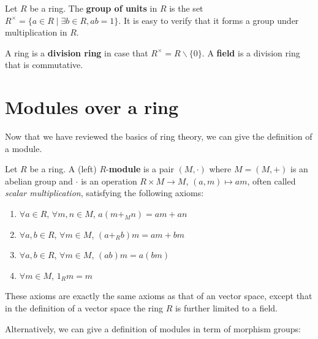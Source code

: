 \documentclass[12pt, a4paper, titlepage]{report}
\begin{document}
\begin{defn}
  Let $R$ be a ring. The \textbf{group of units} in $R$ is the set
  $R^{\times} = \{ a \in R \mid \exists b \in R, ab = 1 \}$. It is easy to
  verify that it forms a group under multiplication in $R$.
\end{defn}

\begin{defn}
  A ring is a \textbf{division ring} in case that $R^{\times} = R \backslash \{0\}$.
  A \textbf{field} is a division ring that is commutative.
\end{defn}

\section{Modules over a ring}
Now that we have reviewed the basics of ring theory, we can give the definition of a module.

\begin{defn}[module]
  Let $R$ be a ring. A (left) $R$-\textbf{module} is a pair $(M, \cdot)$ where $M = (M, +)$ is an abelian group
  and $\cdot$ is an operation $R \times M \rightarrow M$, $(a, m) \mapsto am$, often called \textit{scalar multiplication},
  satisfying the following axioms:
  \begin{enumerate}
  \item $\forall a \in R$, $\forall m, n \in M$, $a(m +_{M} n) = am + an$
  \item $\forall a, b \in R$, $\forall m \in M$, $(a +_{R} b)m = am + bm$
  \item $\forall a, b \in R$, $\forall m \in M$, $(ab)m = a(bm)$
  \item $\forall m \in M$, $1_{R}m = m$
  \end{enumerate}
\end{defn}

\begin{rem}
  These axioms are exactly the same axioms as that of an vector space, except that in the definition of a vector space
  the ring $R$ is further limited to a field. 
\end{rem}

Alternatively, we can give a definition of modules in term of morphism groups:
\end{document}
